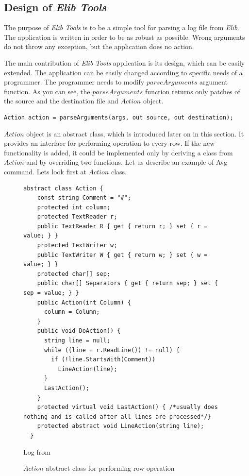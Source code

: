 \documentclass[12pt,notitlepage]{report}
\begin{document}
\subsection*{Design of {\it Elib Tools}}\label{sec:design}
	The purpose of {\it Elib Tools} is to be a simple tool for parsing a log file from {\it Elib}.
	The application is written in order to be as robust as possible.
	Wrong arguments do not throw any exception, but the application does no action.

	The main contribution of {\it Elib Tools} application is its design, which can be easily extended.
	The application can be easily changed according to specific needs of a programmer.
	The programmer needs to modify $parseArguments$ argument function.
	As you can see, the $parseArguments$ function returns only patches 
	of the source and the destination file and $Action$ object.
\begin{lstlisting}
Action action = parseArguments(args, out source, out destination);
\end{lstlisting}
	
	$Action$ object is an abstract class, which is introduced later on in this section. It provides
	an interface for performing operation to every row.
	If the new functionality is added, it could be implemented only by deriving 
	a class from $Action$ and by overriding
	two functions. Let us describe an example of Avg command. Lets look first at $Action$ class.
\begin{figure}[!hbp]
\begin{lstlisting}
abstract class Action {
    const string Comment = "#";
    protected int column;
    protected TextReader r;
    public TextReader R { get { return r; } set { r = value; } }
    protected TextWriter w;
    public TextWriter W { get { return w; } set { w = value; } }
    protected char[] sep;
    public char[] Separators { get { return sep; } set { sep = value; } }
    public Action(int Column) {
      column = Column;
    }
    public void DoAction() {
      string line = null;
      while ((line = r.ReadLine()) != null) {
        if (!line.StartsWith(Comment))
          LineAction(line);
      }
      LastAction();
    }
    protected virtual void LastAction() { /*usually does nothing and is called after all lines are processed*/}
    protected abstract void LineAction(string line);
  }
\end{lstlisting}

	Log from 
\caption{$Action$ abstract class for performing row operation}\label{action}
\end{figure}
\end{document}
